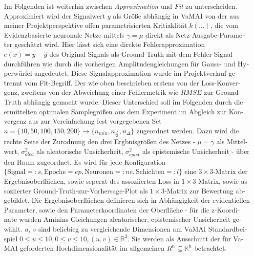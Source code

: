 \begin{otherlanguage}{ngerman}
Im Folgenden ist weiterhin zwischen \textit{Approximation} und \textit{Fit} zu unterscheiden. Approximiert wird der Signalwert $y$ als Größe abhängig in VaMAI von der aus meiner Projektperspektive offen parametrisierten Kritiaklität $k(\dots)$, die vom \gls{Evidenzbasierte neuronale Netze} mittels $\gamma = \mu$ direkt als Netz-Ausgabe-Parameter geschätzt wird. Hier lässt sich eine direkte Fehlerapproximation $e(x) = y - \hat{y}$ des Original-Signals als Ground-Truth mit dem Fehler-Signal durchführen wie durch die vorherigen Amplitudengleichungen für Gauss- und Hyperwürfel angedeutet. Diese Signalapproximation wurde im Projektverlauf getrennt vom Fit-Begriff. Der wie oben beschrieben erstens von der Loss-Konvergenz, zweitens von der Abweichung einer Fehlermetrik wie $\textit{RMSE}$ zur Ground-Truth abhängig gemacht wurde. Dieser Unterschied soll im Folgenden durch die ermittelten optimalen Samplegrößen aus dem Experiment im Abgleich zur Konvergenz aus zur Vereinfachung fest vorgegebenen Set $n = \{ 10, 50, 100, 150, 200 \} \rightarrow \{ n_{min}, n_{\frac{\Delta}{2}}, n_{\Delta} \}$ zugeordnet werden. Dazu wird die rechte Seite der Zurodnung den drei Ergbnisgrößen des Netzes - $\mu = \gamma$ als Mittelwert, $\sigma^{2}_{alea}$ als aleatorische Unsicherheit, $\sigma^{2}_{epist}$ als epistemische Unsicherheit - über den Raum zugeordnet. Es wird für jede Konfiguration $\{\text{Signal} =: s,\text{Epoche} = ep,\text{Neuronen} =: ne, \text{Schichten} =: l \}$ eine $3\times3$-Matrix der Ergebnisoberflächen, sowie seperat des assoziierten Loss in $1\times3$-Matrix, sowie assoziierter Ground-Truth-zur-Vorhersage-Plot als $1\times3$-Matrix zur Bewertung abgebildet. Die Ergebnisoberflächen definieren sich in Abhängigkeit der evidentiellen Parameter, sowie den Parameterkoordinaten der Oberfläche - für die z-Koordinate wurden Aminins Gleichungen aleatorischer, epistemischer Unsicherheit gewählt. $u$, $v$ sind beliebieg zu vergleichende Dimensionen am VaMAI Standardbeispiel $0 \leq u \leq 10, 0 \leq v \leq 10, (u,v) \in \mathbb{R}^3$. Sie werden als Ausschnitt der für VaMAI geforderten Hochdimensionalität im allgemeinen $R^{n} \subseteq \mathbb{K}^{n}$ betrachtet.


\end{otherlanguage}
